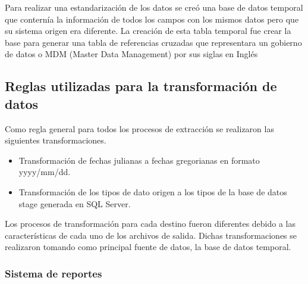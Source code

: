 Para realizar una estandarización de los datos se creó una base de datos
temporal que conternía la información de todos los campos con los mismos datos
pero que su sistema origen era diferente. La creación de esta tabla temporal fue
crear la base para generar una tabla de referencias cruzadas que representara un
gobierno de datos o MDM (Master Data Management) por sus siglas en Inglés

\subsection{Reglas utilizadas para la transformación de datos}

Como regla general para todos los procesos de extracción se realizaron las
siguientes transformaciones.

\begin{itemize}
\item Transformación de fechas julianas a fechas gregorianas en formato
  \linebreak \mbox{yyyy/mm/dd}.
\item Transformación de los tipos de dato origen a los tipos de la base de
  datos stage generada en SQL Server.
\end{itemize}

Los procesos de transformación para cada destino fueron diferentes debido a las
características de cada uno de los archivos de salida. Dichas transformaciones
se realizaron tomando como principal fuente de datos, la base de datos temporal.

\subsubsection{Sistema de reportes}

